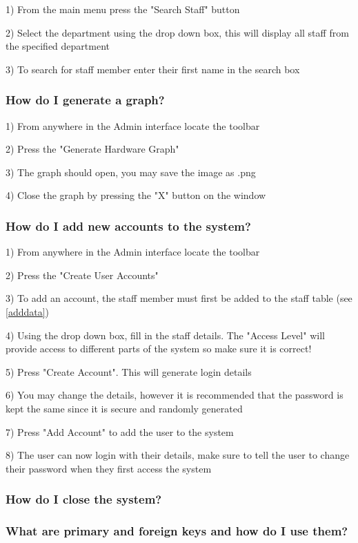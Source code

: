 1) From the main menu press the "Search Staff" button

2) Select the department using the drop down box, this will display all staff from the specified department

3) To search for staff member enter their first name in the search box

\subsubsection{How do I generate a graph?}

1) From anywhere in the Admin interface locate the toolbar

2) Press the "Generate Hardware Graph"

3) The graph should open, you may save the image as .png

4) Close the graph by pressing the "X" button on the window

\subsubsection{How do I add new accounts to the system?}

1) From anywhere in the Admin interface locate the toolbar

2) Press the "Create User Accounts"

3) To add an account, the staff member must first be added to the staff table (see \ref{adddata})

4) Using the drop down box, fill in the staff details. The "Access Level" will provide access to different parts of the system so make sure it is correct! 

5) Press "Create Account". This will generate login details

6) You may change the details, however it is recommended that the password is kept the same since it is secure and randomly generated

7) Press "Add Account" to add the user to the system

8) The user can now login with their details, make sure to tell the user to change their password when they first access the system

\subsubsection{How do I close the system?}

\subsubsection{What are primary and foreign keys and how do I use them?}\label{keys}

